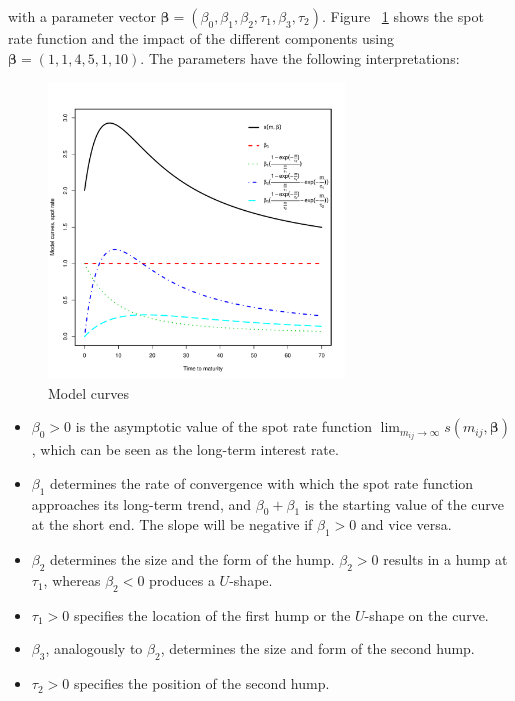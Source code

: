 with a parameter vector ${\bm{\beta}} = \left(\beta_0,\beta_1,\beta_2,\tau_1,\beta_3,\tau_2\right)$. Figure ~\ref{fig:modelcurves} shows the \cite{Svensson1994} spot rate function and the impact of the different components using $\bm{\beta} = (1, 1, 4, 5, 1, 10)$. The parameters have the following interpretations:

%

\begin{figure}[htb]
\centering
  \caption{Model curves}
 \label{fig:modelcurves}
\includegraphics[width=0.7\textwidth]{curveshape}
\end{figure}

\begin{itemize}
\item $\beta_0>0$ is the asymptotic value of the spot rate function $\lim_{m_{ij}\to\infty}s(m_{ij},\bm{\beta})$, which can be seen as the long-term interest rate.
\item $\beta_1$ determines the rate of convergence with which the spot rate function approaches its long-term trend, and $\beta_0+\beta_1$ is the starting value of the curve at the short end. The slope will be negative if $\beta_1>0$ and vice versa.
\item $\beta_2$ determines the size and the form of the hump. $\beta_2 >0$  results in a hump at  $\tau_1$, whereas $\beta_2<0$ produces a $U$-shape.
\item $\tau_1>0$ specifies the location of the first hump or the $U$-shape on the curve.
\item $\beta_3$, analogously to $\beta_2$, determines the size and form of the second hump.
\item $\tau_2>0$ specifies the position of the second hump.
\end{itemize}

